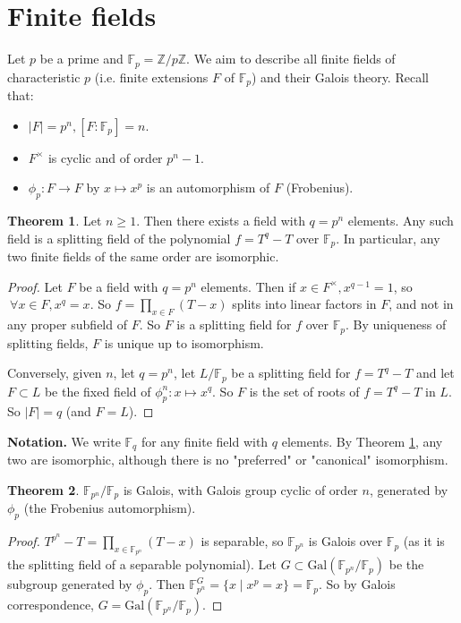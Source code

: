 \documentclass{article}
\theoremstyle{definition}
\newtheorem{theorem}{Theorem}[section]
\begin{document}
\section{Finite fields}

Let $p$ be a prime and $\mathbb{F}_p = \mathbb{Z}/p\mathbb{Z}$. We aim to describe all finite fields of characteristic $p$ (i.e. finite extensions $F$ of $\mathbb{F}_p$) and their Galois theory. Recall that:
\begin{itemize}
    \item $|F|=p^n, [F : \mathbb{F}_p] = n$.
    \item $F^{\times}$ is cyclic and of order $p^n-1$.
    \item $\phi_p : F \to F$ by $x \mapsto x^p$ is an automorphism of $F$ (Frobenius).
\end{itemize}
\begin{theorem}\label{10.1}
    Let $n\ge 1$. Then there exists a field with $q=p^n$ elements. Any such field is a splitting field of the polynomial $f=T^q-T$ over $\mathbb{F}_p$. In particular, any two finite fields of the same order are isomorphic.
\end{theorem}
\begin{proof}
    Let $F$ be a field with $q=p^n$ elements. Then if $x \in F^{\times}, x^{q-1}=1$, so $~\forall x \in F, x^q = x$. So $f = \prod_{x \in F}^{} (T-x)$ splits into linear factors in $F$, and not in any proper subfield of $F$. So $F$ is a splitting field for $f$ over $\mathbb{F}_p$. By uniqueness of splitting fields, $F$ is unique up to isomorphism.
    \vspace{1mm}

    Conversely, given $n$, let $q=p^n$, let $L/\mathbb{F}_p$ be a splitting field for $f = T^q - T$ and let $F \subset L$ be the fixed field of $\phi_p^n : x \mapsto x^q$. So $F$ is the set of roots of $f= T^q-T$ in $L$. So $|F|=q$ (and $F=L$).
\end{proof}
\textbf{Notation.}  We write $\mathbb{F}_q$ for any finite field with $q$ elements. By Theorem \ref{10.1}, any two are isomorphic, although there is no "preferred" or "canonical" isomorphism.
\begin{theorem}
    $\mathbb{F}_{p^n}/\mathbb{F}_p$ is Galois, with Galois group cyclic of order $n$, generated by $\phi_p$ (the Frobenius automorphism).
\end{theorem}
\begin{proof}
    $T^{p^n}-T = \prod_{x \in \mathbb{F}_{p^n}}^{} (T-x)$ is separable, so $\mathbb{F}_{p^n}$ is Galois over $\mathbb{F}_p$ (as it is the splitting field of a separable polynomial). Let $G\subset \text{Gal}(\mathbb{F}_{p^n}/\mathbb{F}_p)$ be the subgroup generated by $\phi_p$. Then $\mathbb{F}_{p^n}^{G} = \{x \mid x^p = x\} = \mathbb{F}_p$. So by Galois correspondence, $G = \text{Gal}(\mathbb{F}_{p^n}/\mathbb{F}_p)$.
\end{proof}
\end{document}

